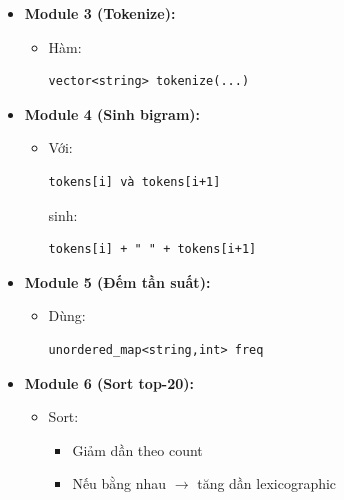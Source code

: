 \begin{itemize}
\begin{itemize}
\begin{itemize}
            \item Chuyển lowercase
            \item Ký tự không phải chữ/số
            $\rightarrow$
            space
            \item Gom nhiều space thành 1
        \end{itemize}

        \item \textbf{Module 3 (Tokenize):}

        \begin{itemize}
            \item Hàm:
\begin{lstlisting}
vector<string> tokenize(...)
\end{lstlisting}
        \end{itemize}

        \item \textbf{Module 4 (Sinh bigram):}

        \begin{itemize}
            \item Với:
\begin{lstlisting}
tokens[i] và tokens[i+1]
\end{lstlisting}

            sinh:
\begin{lstlisting}
tokens[i] + " " + tokens[i+1]
\end{lstlisting}
        \end{itemize}

        \item \textbf{Module 5 (Đếm tần suất):}

        \begin{itemize}
            \item Dùng:
\begin{lstlisting}
unordered_map<string,int> freq
\end{lstlisting}
        \end{itemize}

        \item \textbf{Module 6 (Sort top-20):}

        \begin{itemize}
            \item Sort:
            \begin{itemize}
                \item Giảm dần theo count
                \item Nếu bằng nhau
                $\rightarrow$
                tăng dần lexicographic
            \end{itemize}


\end{itemize}
\end{itemize}
\end{itemize}
